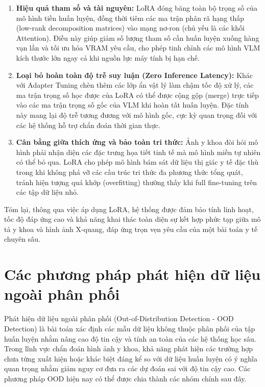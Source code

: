 \begin{enumerate}
    \item \textbf{Hiệu quả tham số và tài nguyên:} LoRA đóng băng toàn bộ trọng số của mô hình tiền huấn luyện, đồng thời tiêm các ma trận phân rã hạng thấp (low-rank decomposition matrices) vào mạng nơ-ron (chủ yếu là các khối Attention). Điều này giúp giảm số lượng tham số cần huấn luyện xuống hàng vạn lần và tối ưu hóa VRAM yêu cầu, cho phép tinh chỉnh các mô hình VLM kích thước lớn ngay cả khi nguồn lực máy tính bị hạn chế.
    \item \textbf{Loại bỏ hoàn toàn độ trễ suy luận (Zero Inference Latency):} Khác với Adapter Tuning chèn thêm các lớp ẩn vật lý làm chậm tốc độ xử lý, các ma trận trọng số học được của LoRA có thể được cộng gộp (merge) trực tiếp vào các ma trận trọng số gốc của VLM khi hoàn tất huấn luyện. Đặc tính này mang lại độ trễ tương đương với mô hình gốc, cực kỳ quan trọng đối với các hệ thống hỗ trợ chẩn đoán thời gian thực.
    \item \textbf{Cân bằng giữa thích ứng và bảo toàn tri thức:} Ảnh y khoa đòi hỏi mô hình phải nhận diện các đặc trưng họa tiết tinh tế mà mô hình miền tự nhiên có thể bỏ qua. LoRA cho phép mô hình bám sát dữ liệu thị giác y tế đặc thù trong khi không phá vỡ các cấu trúc tri thức đa phương thức tổng quát, tránh hiện tượng quá khớp (overfitting) thường thấy khi full fine-tuning trên các tập dữ liệu nhỏ.
\end{enumerate}
Tóm lại, thông qua việc áp dụng LoRA, hệ thống được đảm bảo tính linh hoạt, tốc độ đáp ứng cao và khả năng khai thác toàn diện sự kết hợp phức tạp giữa mô tả y khoa và hình ảnh X-quang, đáp ứng trọn vẹn yêu cầu của một bài toán y tế chuyên sâu.

\section{Các phương pháp phát hiện dữ liệu ngoài phân phối} 
Phát hiện dữ liệu ngoài phân phối (Out-of-Distribution Detection - OOD Detection) là bài toán xác định các mẫu dữ liệu không thuộc phân phối của tập huấn luyện nhằm nâng cao độ tin cậy và tính an toàn của các hệ thống học sâu. Trong lĩnh vực chẩn đoán hình ảnh y khoa, khả năng phát hiện các trường hợp chưa từng xuất hiện hoặc khác biệt đáng kể so với dữ liệu huấn luyện có ý nghĩa quan trọng nhằm giảm nguy cơ đưa ra các dự đoán sai với độ tin cậy cao. Các phương pháp OOD hiện nay có thể được chia thành các nhóm chính sau đây. 

